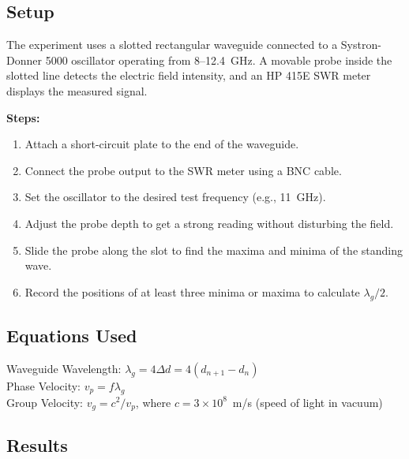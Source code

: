 \documentclass[11pt,letterpaper]{article}
\begin{document}
\subsection*{Setup}

The experiment uses a slotted rectangular waveguide connected to a Systron-Donner 5000 oscillator operating from 8--12.4~GHz. A movable probe inside the slotted line detects the electric field intensity, and an HP 415E SWR meter displays the measured signal.

\textbf{Steps:}
\begin{enumerate}[leftmargin=*]
  \item Attach a short-circuit plate to the end of the waveguide.
  \item Connect the probe output to the SWR meter using a BNC cable.
  \item Set the oscillator to the desired test frequency (e.g., 11~GHz).
  \item Adjust the probe depth to get a strong reading without disturbing the field.
  \item Slide the probe along the slot to find the maxima and minima of the standing wave.
  \item Record the positions of at least three minima or maxima to calculate $\lambda_g/2$.
\end{enumerate}

\subsection*{Equations Used}

Waveguide Wavelength: $\lambda_g = 4\Delta d = 4(d_{n+1} - d_n)$\\[2pt]
Phase Velocity: $v_p = f\lambda_g$\\[2pt]
Group Velocity: $v_g = c^2/v_p$, where $c = 3\times10^{8}$~m/s (speed of light in vacuum)

\subsection*{Results}
\end{document}
